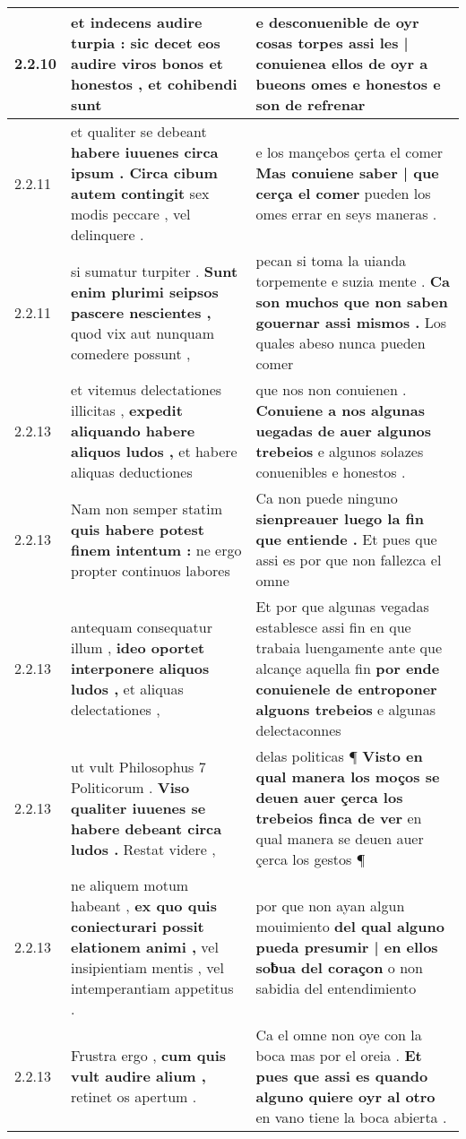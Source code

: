 \begin{tabular}{|p{1cm}|p{6.5cm}|p{6.5cm}|}
2.2.10 & et indecens audire turpia : \textbf{ sic decet eos audire viros bonos et honestos , } et cohibendi sunt & e desconuenible de oyr cosas torpes \textbf{ assi les | conuienea ellos de oyr a bueons omes e honestos } e son de refrenar \\\hline
2.2.11 & et qualiter se debeant \textbf{ habere iuuenes circa ipsum . Circa cibum autem contingit } sex modis peccare , vel delinquere . & e los mançebos çerta el comer \textbf{ Mas conuiene saber | que cerça el comer } pueden los omes errar en seys maneras . \\\hline
2.2.11 & si sumatur turpiter . \textbf{ Sunt enim plurimi seipsos pascere nescientes , } quod vix aut nunquam comedere possunt , & pecan si toma la uianda torpemente e suzia mente . \textbf{ Ca son muchos que non saben gouernar assi mismos . } Los quales abeso nunca pueden comer \\\hline
2.2.13 & et vitemus delectationes illicitas , \textbf{ expedit aliquando habere aliquos ludos , } et habere aliquas deductiones & que nos non conuienen . \textbf{ Conuiene a nos algunas uegadas de auer algunos trebeios } e algunos solazes conuenibles e honestos . \\\hline
2.2.13 & Nam non semper statim \textbf{ quis habere potest finem intentum : } ne ergo propter continuos labores & Ca non puede ninguno \textbf{ sienpreauer luego la fin que entiende . } Et pues que assi es por que non fallezca el omne \\\hline
2.2.13 & antequam consequatur illum , \textbf{ ideo oportet interponere aliquos ludos , } et aliquas delectationes , & Et por que algunas vegadas establesce assi fin en que trabaia luengamente ante que alcançe aquella fin \textbf{ por ende conuienele de entroponer alguons trebeios } e algunas delectaconnes \\\hline
2.2.13 & ut vult Philosophus 7 Politicorum . \textbf{ Viso qualiter iuuenes se habere debeant circa ludos . } Restat videre , & delas politicas ¶ \textbf{ Visto en qual manera los moços se deuen auer çerca los trebeios finca de ver } en qual manera se deuen auer çerca los gestos ¶ \\\hline
2.2.13 & ne aliquem motum habeant , \textbf{ ex quo quis coniecturari possit elationem animi , } vel insipientiam mentis , vel intemperantiam appetitus . & por que non ayan algun mouimiento \textbf{ del qual alguno pueda presumir | en ellos soƀua del coraçon } o non sabidia del entendimiento \\\hline
2.2.13 & Frustra ergo , \textbf{ cum quis vult audire alium , } retinet os apertum . & Ca el omne non oye con la boca mas por el oreia . \textbf{ Et pues que assi es quando alguno quiere oyr al otro } en vano tiene la boca abierta . \\\hline

\end{tabular}
